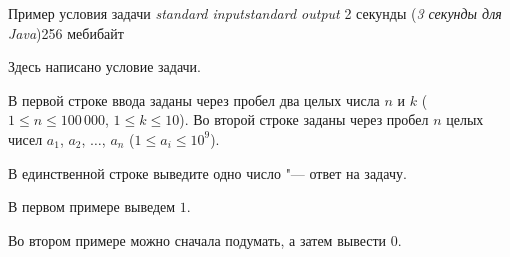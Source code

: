 \begin{problem}{Пример условия задачи}
{\textsl{standard input}}{\textsl{standard output}}
{2 секунды (\textsl{3 секунды для Java})}{256 мебибайт}{}

Здесь написано условие задачи.

\InputFile

В первой строке ввода заданы через пробел два целых числа $n$ и $k$
($1 \le n \le 100\,000$, $1 \le k \le 10$).
Во второй строке заданы через пробел $n$ целых чисел
$a_1$, $a_2$, $\ldots$, $a_n$
($1 \le a_i \le 10^9$).

\OutputFile

В единственной строке выведите одно число "--- ответ на задачу.

\Examples

\begin{example}
%
%
\end{example}

\Explanations

В первом примере выведем $1$.

Во втором примере можно сначала подумать, а затем вывести $0$.

\end{problem}
